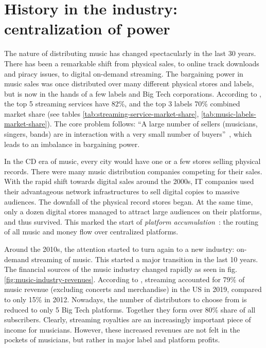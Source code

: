\section{History in the industry: centralization of power}
The nature of distributing music has changed spectacularly in the last 30 years. There has been a remarkable shift from physical sales, to online track downloads and piracy issues, to digital on-demand streaming. The bargaining power in music sales was once distributed over many different physical stores and labels, but is now in the hands of a few labels and Big Tech corporations. According to \cite{midiamarketshare2020}, the top 5 streaming services have 82\%, and the top 3 labels 70\% combined market share (see tables \ref{tab:streaming-service-market-share}, \ref{tab:music-labels-market-share}). The core problem follows: ``A large number of sellers (musicians, singers, bands) are in interaction with a very small number of buyers''~\citep{rayna2009monometapoly}, which leads to an imbalance in bargaining power.

In the CD era of music, every city would have one or a few stores selling physical records. There were many music distribution companies competing for their sales. With the rapid shift towards digital sales around the 2000s, IT companies used their advantageous network infrastructures to sell digital copies to massive audiences. The downfall of the physical record stores began. At the same time, only a dozen digital stores managed to attract large audiences on their platforms, and thus survived. This marked the start of \textit{platform accumulation}~\citep{meier2019rising}: the routing of all music and money flow over centralized platforms.

Around the 2010s, the attention started to turn again to a new industry: on-demand streaming of music. This started a major transition in the last 10 years. The financial sources of the music industry changed rapidly as seen in fig. \ref{fig:music-industry-revenues}. According to \cite{friedlander2020mid}, streaming accounted for 79\% of music revenue (excluding concerts and merchandise) in the US in 2019, compared to only 15\% in 2012. Nowadays, the number of distributors to choose from is reduced to only 5 Big Tech platforms. Together they form over 80\% share of all subscribers. Clearly, streaming royalties are an increasingly important piece of income for musicians. However, these increased revenues are not felt in the pockets of musicians, but rather in major label and platform profits.

